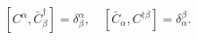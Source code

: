 \begin{equation}\label{5.8}
[C^\alpha,\bar{C}^\dagger_\beta]=\delta^\alpha_\beta,\quad
[\bar{C}_\alpha,C^{\dagger\beta}]=\delta_\alpha^\beta.
\end{equation}

